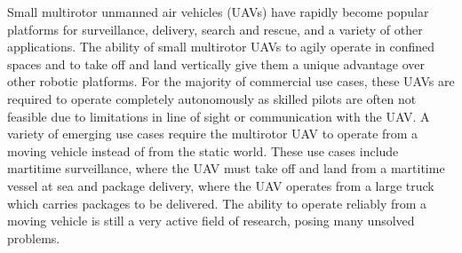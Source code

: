 
Small multirotor unmanned air vehicles (UAVs) have rapidly become popular platforms for
surveillance, delivery, search and rescue, and a variety of other applications.
The ability of small multirotor UAVs to agily operate in confined spaces and to
take off and land vertically give them a unique advantage over other robotic
platforms. For the majority of commercial use cases, these UAVs are required to operate
completely autonomously as skilled pilots are often not feasible due to
limitations in line of sight or communication with the UAV. 
A variety of emerging use cases
require the multirotor UAV to operate from a moving vehicle instead of from the
static world. These use
cases include martitime surveillance, where the UAV must take off and land from
a martitime vessel at sea
and package delivery, where the UAV operates from a large truck
which carries packages to be delivered. The ability to operate reliably from a
moving vehicle is still a very active field of research, posing many unsolved
problems.



